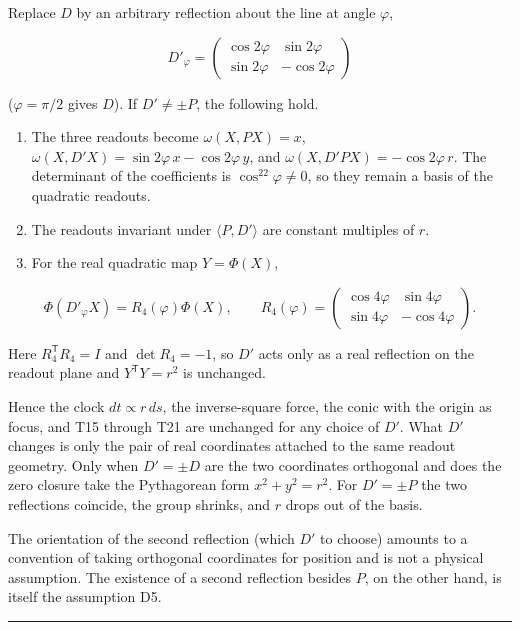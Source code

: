 \documentclass[
  a4paper,
]{article}
\providecommand{\tightlist}{%
  \setlength{\itemsep}{0pt}\setlength{\parskip}{0pt}}
\begin{document}
Replace \(D\) by an arbitrary reflection about the line at angle
\(\varphi\),

\[
D'_\varphi=\begin{pmatrix}\cos2\varphi&\sin2\varphi\\\sin2\varphi&-\cos2\varphi\end{pmatrix}
\]

(\(\varphi=\pi/2\) gives \(D\)). If \(D'\neq\pm P\), the following hold.

\begin{enumerate}
\def\labelenumi{\arabic{enumi}.}
\tightlist
\item
  The three readouts become \(\omega(X,PX)=x\),
  \(\omega(X,D'X)=\sin2\varphi\,x-\cos2\varphi\,y\), and
  \(\omega(X,D'PX)=-\cos2\varphi\,r\). The determinant of the
  coefficients is \(\cos^22\varphi\neq0\), so they remain a basis of the
  quadratic readouts.
\item
  The readouts invariant under \(\langle P,D'\rangle\) are constant
  multiples of \(r\).
\item
  For the real quadratic map \(Y=\Phi(X)\),
\end{enumerate}

\[
\Phi(D'_\varphi X)=R_4(\varphi)\Phi(X),\qquad
R_4(\varphi)=
\begin{pmatrix}
\cos4\varphi&\sin4\varphi\\
\sin4\varphi&-\cos4\varphi
\end{pmatrix}.
\]

Here \(R_4^{\mathsf T}R_4=I\) and \(\det R_4=-1\), so \(D'\) acts only
as a real reflection on the readout plane and \(Y^{\mathsf T}Y=r^2\) is
unchanged.

Hence the clock \(dt\propto r\,ds\), the inverse-square force, the conic
with the origin as focus, and T15 through T21 are unchanged for any
choice of \(D'\). What \(D'\) changes is only the pair of real
coordinates attached to the same readout geometry. Only when
\(D'=\pm D\) are the two coordinates orthogonal and does the zero
closure take the Pythagorean form \(x^2+y^2=r^2\). For \(D'=\pm P\) the
two reflections coincide, the group shrinks, and \(r\) drops out of the
basis.

The orientation of the second reflection (which \(D'\) to choose)
amounts to a convention of taking orthogonal coordinates for position
and is not a physical assumption. The existence of a second reflection
besides \(P\), on the other hand, is itself the assumption D5.

\begin{center}\rule{0.5\linewidth}{0.5pt}\end{center}
\end{document}
